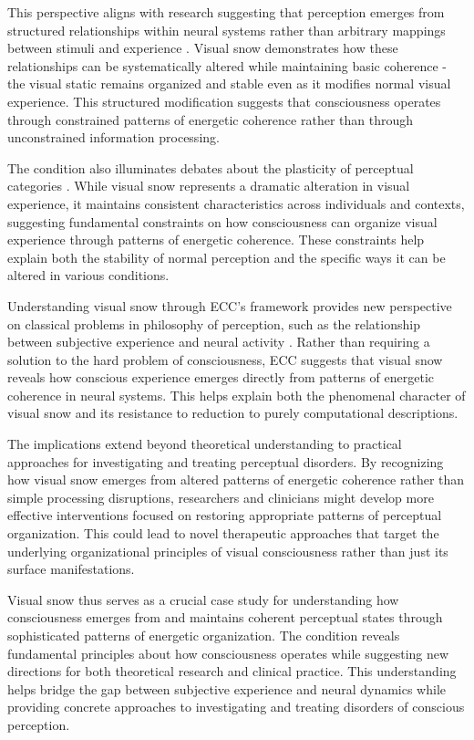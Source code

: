 \begin{refsection}
This perspective aligns with research suggesting that perception emerges from structured relationships within neural systems rather than arbitrary mappings between stimuli and experience \cite{Thompson1995}. Visual snow demonstrates how these relationships can be systematically altered while maintaining basic coherence - the visual static remains organized and stable even as it modifies normal visual experience. This structured modification suggests that consciousness operates through constrained patterns of energetic coherence rather than through unconstrained information processing.

The condition also illuminates debates about the plasticity of perceptual categories \cite{VanBrakel1993}. While visual snow represents a dramatic alteration in visual experience, it maintains consistent characteristics across individuals and contexts, suggesting fundamental constraints on how consciousness can organize visual experience through patterns of energetic coherence. These constraints help explain both the stability of normal perception and the specific ways it can be altered in various conditions.

Understanding visual snow through ECC's framework provides new perspective on classical problems in philosophy of perception, such as the relationship between subjective experience and neural activity \cite{Tye2000}. Rather than requiring a solution to the hard problem of consciousness, ECC suggests that visual snow reveals how conscious experience emerges directly from patterns of energetic coherence in neural systems. This helps explain both the phenomenal character of visual snow and its resistance to reduction to purely computational descriptions.

The implications extend beyond theoretical understanding to practical approaches for investigating and treating perceptual disorders. By recognizing how visual snow emerges from altered patterns of energetic coherence rather than simple processing disruptions, researchers and clinicians might develop more effective interventions focused on restoring appropriate patterns of perceptual organization. This could lead to novel therapeutic approaches that target the underlying organizational principles of visual consciousness rather than just its surface manifestations.

Visual snow thus serves as a crucial case study for understanding how consciousness emerges from and maintains coherent perceptual states through sophisticated patterns of energetic organization. The condition reveals fundamental principles about how consciousness operates while suggesting new directions for both theoretical research and clinical practice. This understanding helps bridge the gap between subjective experience and neural dynamics while providing concrete approaches to investigating and treating disorders of conscious perception.


\end{refsection}
